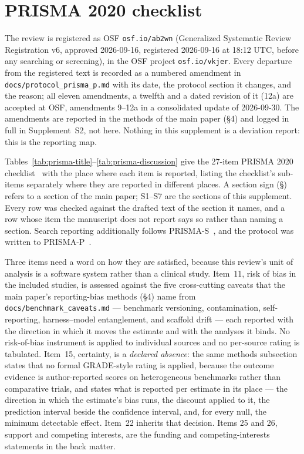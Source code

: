 \section{PRISMA 2020 checklist}
\label{app:prisma}

The review is registered as OSF \texttt{osf.io/ab2wn} (Generalized Systematic Review Registration
v6, approved 2026-09-16, registered 2026-09-16 at 18:12 UTC, before any searching or screening), in
the OSF project \texttt{osf.io/vkjer}. Every departure from the registered text is recorded as a
numbered amendment in \texttt{docs/protocol\_prisma\_p.md} with its date, the protocol section it
changes, and the reason; all eleven amendments, a twelfth and a dated revision of it (12a) are accepted at OSF, amendments 9--12a
in a consolidated update of 2026-09-30. The
amendments are reported in the methods of the main paper (\S4) and logged in full in Supplement~S2,
not here. Nothing in this supplement is a deviation report: this is the reporting map.

Tables~\ref{tab:prisma-title}--\ref{tab:prisma-discussion} give the 27-item PRISMA 2020
checklist~\citep{page2021prisma,page2021prismaexplanation} with the place where each item is reported,
listing the checklist's sub-items separately where they are reported in different places. A section
sign (\S) refers to a section of the main paper; S1--S7 are the sections of this supplement. Every row
was checked against the drafted text of the section it names, and a row whose item the manuscript does
not report says so rather than naming a section. Search reporting additionally follows
PRISMA-S~\citep{rethlefsen2021prismas}, and the protocol was written to
PRISMA-P~\citep{shamseer2015prismap}.

Three items need a word on how they are satisfied, because this review's unit of analysis is a
software system rather than a clinical study. Item~11, risk of bias in the included studies, is
assessed against the five cross-cutting caveats that the main paper's reporting-bias methods (\S4)
name from \texttt{docs/benchmark\_caveats.md} --- benchmark versioning, contamination, self-reporting,
harness--model entanglement, and scaffold drift --- each reported with the direction in which it moves
the estimate and with the analyses it binds. No risk-of-bias instrument is applied to individual
sources and no per-source rating is tabulated. Item~15, certainty, is a \emph{declared absence}:
the same methods subsection states that no formal GRADE-style rating is applied, because the outcome
evidence is author-reported scores on heterogeneous benchmarks rather than comparative trials, and
states what is reported per estimate in its place --- the direction in which the estimate's bias runs,
the discount applied to it, the prediction interval beside the confidence interval, and, for every
null, the minimum detectable effect. Item~22 inherits that decision. Items 25 and 26, support and
competing interests, are the funding and competing-interests statements in the back matter.

